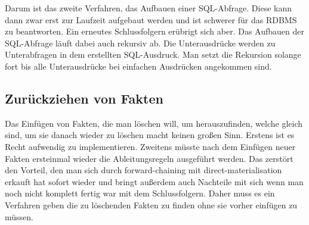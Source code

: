 Darum ist das zweite Verfahren, das Aufbauen einer SQL-Abfrage. Diese kann dann zwar erst zur Laufzeit aufgebaut werden und ist schwerer für das RDBMS zu beantworten. Ein erneutes Schlussfolgern erübrigt sich aber. Das Aufbauen der SQL-Abfrage läuft dabei auch rekursiv ab. Die Unterausdrücke werden zu Unterabfragen in dem erstellten SQL-Ausdruck. Man setzt die Rekursion solange fort bis alle Unterausdrücke bei einfachen Ausdrücken angekommen sind.

\subsection{Zurückziehen von Fakten}
Das Einfügen von Fakten, die man löschen will, um herauszufinden, welche gleich sind, um sie danach wieder zu löschen macht keinen großen Sinn. Erstens ist es Recht aufwendig zu implementieren. Zweitens müsste nach dem Einfügen neuer Fakten ersteinmal wieder die Ableitungsregeln ausgeführt werden. Das zerstört den Vorteil, den man sich durch forward-chaining mit direct-materialisation erkauft hat sofort wieder und bringt außerdem auch Nachteile mit sich wenn man noch nicht komplett fertig war mit dem Schlussfolgern.
Daher muss es ein Verfahren geben die zu löschenden Fakten zu finden ohne sie vorher einfügen zu müssen.
